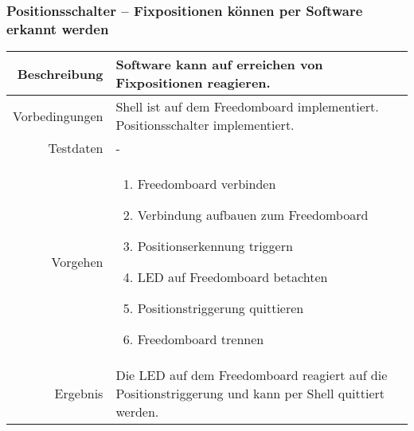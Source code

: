 \subsubsection{Positionsschalter -- Fixpositionen können per Software erkannt werden}
\begin{table}[h!]
	\renewcommand{\arraystretch}{1.5}
	\begin{tabular}{|r|p{14cm}|}
		\hline Beschreibung	&
			Software kann auf erreichen von Fixpositionen reagieren. \\ 
		\hline Vorbedingungen	&
			Shell ist auf dem Freedomboard implementiert.
			Positionsschalter implementiert. \\ 
		\hline Testdaten	& - \\ 
		\hline Vorgehen		& 
		\begin{enumerate}
			\item Freedomboard verbinden
			\item Verbindung aufbauen zum Freedomboard
			\item Positionserkennung triggern
			\item LED auf Freedomboard betachten
			\item Positionstriggerung quittieren
			\item Freedomboard trennen
		\end{enumerate} \\ 
		\hline Ergebnis 	&
			Die LED auf dem Freedomboard reagiert auf die
			Positionstriggerung und kann per Shell quittiert werden.\\ 
		\hline 
	\end{tabular}
\end{table}

\newpage
